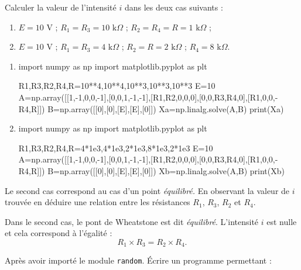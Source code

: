 \question{} Calculer la valeur de l'intensité $i$ dans les deux cas suivants :
		\begin{enumerate}
			\item $E = 10$ V ; $R_1 = R_3 = 10 \text{ k} \Omega$ ; $R_2 = R_4 = R = 1 \text{ k} \Omega$ ;
			\item $E = 10$ V ; $R_1 = R_3 = 4 \text{ k} \Omega$ ; $R_2 = R = 2 \text{ k} \Omega$ ; $R_4= 8 \text{ k} \Omega$.
		\end{enumerate}

		\begin{enumerate}
			\item
\begin{xxpyconsole}%
\begin{pyconsole}
import numpy as np
import matplotlib.pyplot as plt


R1,R3,R2,R4,R=10**4,10**4,10**3,10**3,10**3
E=10
A=np.array([[1,-1,0,0,-1],[0,0,1,-1,-1],[R1,R2,0,0,0],[0,0,R3,R4,0],[R1,0,0,-R4,R]])
B=np.array([[0],[0],[E],[E],[0]])
Xa=np.linalg.solve(A,B)
print(Xa)
\end{pyconsole}
\end{xxpyconsole}
			\item
\begin{xxpyconsole}%
\begin{pyconsole}
import numpy as np
import matplotlib.pyplot as plt


R1,R3,R2,R4,R=4*1e3,4*1e3,2*1e3,8*1e3,2*1e3
E=10
A=np.array([[1,-1,0,0,-1],[0,0,1,-1,-1],[R1,R2,0,0,0],[0,0,R3,R4,0],[R1,0,0,-R4,R]])
B=np.array([[0],[0],[E],[E],[0]])
Xb=np.linalg.solve(A,B)
print(Xb)
\end{pyconsole}
\end{xxpyconsole}
\end{enumerate}

\question{} Le second cas correspond au cas d'un point \textit{équilibré.} En observant la valeur de $i$ trouvée en déduire une relation entre les résistances $R_1$, $R_3$, $R_2$ et $R_4$.



Dans le second cas, le pont de Wheatstone est dit \textit{équilibré}. L'intensité $i$ est nulle et cela correspond à l'égalité :
\[ R_1\times R_3=R_2\times R_4. \]


\question{} Après avoir importé le module \texttt{random}. \'{E}crire un programme permettant :

